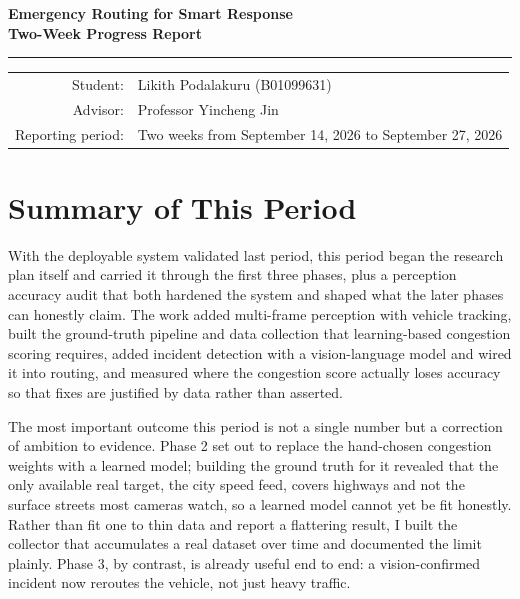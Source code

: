 \documentclass[12pt]{article}
\begin{document}
\begin{center}
  {\Large\bfseries Emergency Routing for Smart Response\\[4pt]
  Two-Week Progress Report\par}
  \vspace{8pt}
  \rule{0.4\textwidth}{0.4pt}
  \vspace{8pt}

  \begin{tabular}{rl}
    Student: & Likith Podalakuru (B01099631) \\
    Advisor: & Professor Yincheng Jin \\
    Reporting period: & Two weeks from September 14, 2026 to September 27, 2026 \\
  \end{tabular}
\end{center}

\section{Summary of This Period}

With the deployable system validated last period, this period began the research
plan itself and carried it through the first three phases, plus a perception
accuracy audit that both hardened the system and shaped what the later phases can
honestly claim. The work added multi-frame perception with vehicle tracking,
built the ground-truth pipeline and data collection that learning-based congestion
scoring requires, added incident detection with a vision-language model and wired
it into routing, and measured where the congestion score actually loses accuracy
so that fixes are justified by data rather than asserted.

The most important outcome this period is not a single number but a correction of
ambition to evidence. Phase 2 set out to replace the hand-chosen congestion
weights with a learned model; building the ground truth for it revealed that the
only available real target, the city speed feed, covers highways and not the
surface streets most cameras watch, so a learned model cannot yet be fit
honestly. Rather than fit one to thin data and report a flattering result, I built
the collector that accumulates a real dataset over time and documented the limit
plainly. Phase 3, by contrast, is already useful end to end: a vision-confirmed
incident now reroutes the vehicle, not just heavy traffic.
\end{document}

